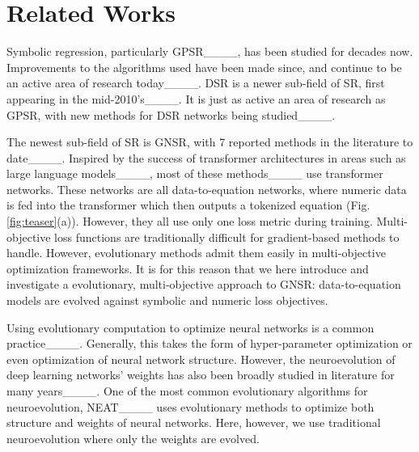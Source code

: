 \section{Related Works}
Symbolic regression, particularly GPSR____, has been studied for decades now. Improvements to the algorithms used have been made since, and continue to be an active area of research today____. DSR is a newer sub-field of SR, first appearing in the mid-2010's____. It is just as active an area of research as GPSR, with new methods for DSR networks being studied____.

The newest sub-field of SR is GNSR, with 7 reported methods in the literature to date____. Inspired by the success of transformer architectures in areas such as large language models____, most of these methods____ use transformer networks. These networks are all data-to-equation networks, where numeric data is fed into the transformer which then outputs a tokenized equation (Fig. \ref{fig:teaser}(a)).
However, they all use only one loss metric during training. Multi-objective loss functions are traditionally difficult for gradient-based methods to handle. However, evolutionary methods admit them easily in multi-objective optimization frameworks. It is for this reason that we here introduce and investigate a evolutionary, multi-objective approach to GNSR: data-to-equation models are evolved against symbolic and numeric loss objectives.

Using evolutionary computation to optimize neural networks is a common practice____. Generally, this takes the form of hyper-parameter optimization or even optimization of neural network structure. However, the neuroevolution of deep learning networks' weights has also been broadly studied in literature for many years____. One of the most common evolutionary algorithms for neuroevolution, NEAT____ uses evolutionary methods to optimize both structure and weights of neural networks. Here, however, we use traditional neuroevolution where only the weights are evolved.